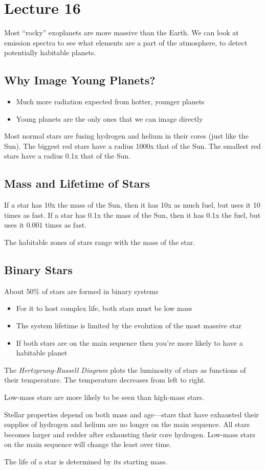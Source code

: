 \documentclass[class=article, crop=false]{standalone}
\begin{document}
  \section{Lecture 16}
  Most ``rocky'' exoplanets are more massive than the Earth. We can look at emission spectra to see what elements are a part of the atmosphere, to detect potentially habitable planets.
  \subsection{Why Image Young Planets?}
  \begin{itemize}
    \item Much more radiation expected from hotter, younger planets
    \item Young planets are the only ones that we can image directly
  \end{itemize}
  Most normal stars are fusing hydrogen and helium in their cores (just like the Sun). The biggest red stars have a radius 1000x that of the Sun. The smallest red stars have a radius 0.1x that of the Sun.
  \subsection{Mass and Lifetime of Stars}
  If a star has 10x the mass of the Sun, then it has 10x as much fuel, but uses it 10 times as fast. If a star has 0.1x the mass of the Sun, then it has 0.1x the fuel, but uses it $0.001$ times as fast.
  \begin{note}{}
    The habitable zones of stars range with the mass of the star.
  \end{note}
  \subsection{Binary Stars}
  About 50\% of stars are formed in binary systems
  \begin{itemize}
    \item For it to host complex life, both stars must be low mass
    \item The system lifetime is limited by the evolution of the most massive star
    \item If both stars are on the main sequence then you're more likely to have a habitable planet
  \end{itemize}
  The \emph{Hertzprung-Russell Diagram} plots the luminosity of stars as functions of their temperature. The temperature decreases from left to right.
  \begin{note}{}
    Low-mass stars are more likely to be seen than high-mass stars.
  \end{note}
  Stellar properties depend on both mass and age---stars that have exhausted their supplies of hydrogen and helium are no longer on the main sequence. All stars becomes larger and redder after exhausting their core hydrogen. Low-mass stars on the main sequence will change the least over time.
  \begin{note}{}
    The life of a star is determined by its starting mass.
  \end{note}
\end{document}
